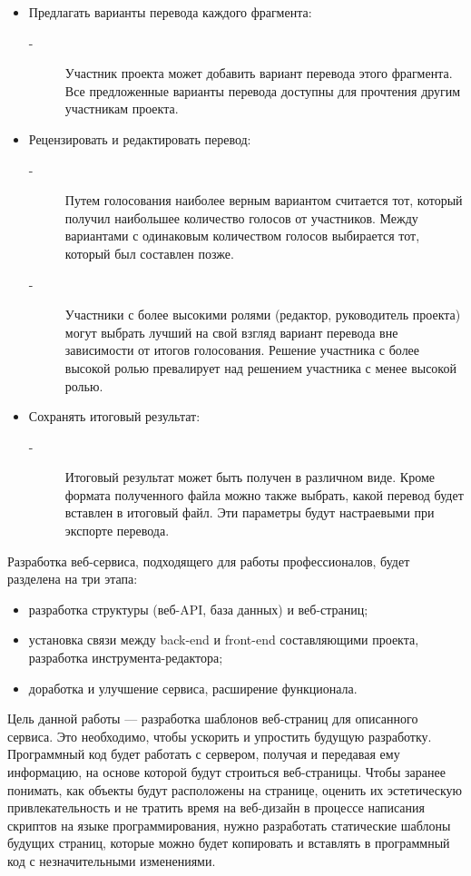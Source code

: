 \documentclass[a4paper,12pt]{article}
\begin{document}
\begin{itemize}
\begin{description}
	\end{description}
	\item Предлагать варианты перевода каждого фрагмента:
	\begin{description}
		\item[-] Участник проекта может добавить вариант перевода этого фрагмента. Все предложенные варианты перевода доступны для прочтения другим участникам проекта.
	\end{description}
	\item Рецензировать и редактировать перевод:
	\begin{description}
		\item[-] Путем голосования наиболее верным вариантом считается тот, который получил наибольшее количество голосов от участников. Между вариантами с одинаковым количеством голосов выбирается тот, который был составлен позже.
		\item[-] Участники с более высокими ролями (редактор, руководитель проекта) могут выбрать лучший на свой взгляд вариант перевода вне зависимости от итогов голосования. Решение участника с более высокой ролью превалирует над решением участника с менее высокой ролью.
	\end{description}
	\item Сохранять итоговый результат:
	\begin{description}
		\item[-] Итоговый результат может быть получен в различном виде. Кроме формата полученного файла можно также выбрать, какой перевод будет вставлен в итоговый файл. Эти параметры будут настраевыми при экспорте перевода.
	\end{description}
\end{itemize}

Разработка веб-сервиса, подходящего для работы профессионалов, будет разделена на три этапа:
\begin{itemize}
	\item разработка структуры (веб-API, база данных) и веб-страниц;
	\item установка связи между back-end и front-end составляющими проекта, разработка инструмента-редактора;
	\item доработка и улучшение сервиса, расширение функционала.\\
\end{itemize}

Цель данной работы — разработка шаблонов веб-страниц для описанного сервиса. Это необходимо, чтобы ускорить и упростить будущую разработку. Программный код будет работать с сервером, получая и передавая ему информацию, на основе которой будут строиться веб-страницы. Чтобы заранее понимать, как объекты будут расположены на странице, оценить их эстетическую привлекательность и не тратить время на веб-дизайн в процессе написания скриптов на языке программирования, нужно разработать статические шаблоны будущих страниц, которые можно будет копировать и вставлять в программный код с незначительными изменениями.
\end{document}
